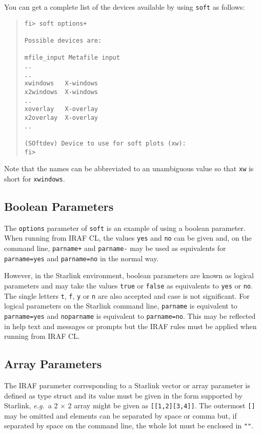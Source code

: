 \documentclass[twoside,11pt]{article}
\newcommand{\xlabel}[1]{}
\begin{document}
You can get a complete list of the devices available by using
\texttt{soft} as follows:
\begin{quote} \begin{verbatim}
fi> soft options+

Possible devices are:

mfile_input Metafile input
..
..
xwindows   X-windows
x2windows  X-windows
..
xoverlay   X-overlay
x2overlay  X-overlay
..

(SOftdev) Device to use for soft plots (xw):
fi>
\end{verbatim} \end{quote}
Note that the names can be abbreviated to an unambiguous value so that
\texttt{xw} is short for \texttt{xwindows}.

\subsection{\xlabel{boolean_parameters}Boolean Parameters}
The \texttt{options} parameter of \texttt{soft} is an example of using a
boolean parameter.
When running from IRAF CL, the values \texttt{yes} and \texttt{no} can be
given and, on the command line, \texttt{parname+} and \texttt{parname-} may be
used as equivalents for \texttt{parname=yes} and \texttt{parname=no} in the
normal way.

However, in the Starlink environment, boolean parameters are known as logical
parameters and may take the values \texttt{true} or \texttt{false} as
equivalents to \texttt{yes} or \texttt{no}.
The single letters \texttt{t}, \texttt{f}, \texttt{y} or \texttt{n} are also
accepted and case is not significant.
For logical parameters on the Starlink command line,
\texttt{parname} is equivalent to \texttt{parname=yes} and
\texttt{noparname} is equivalent to \texttt{parname=no}.
This may be reflected in help text and messages or prompts but the IRAF rules
must be applied when running from IRAF CL.

\subsection{\xlabel{array_parameters}Array Parameters}
The IRAF parameter corresponding to a Starlink vector or array parameter is
defined as type struct and its value must be given in the form supported by
Starlink, \textit{e.g.}\ a 2 $\times$ 2 array might be given as
\texttt{[[1,2][3,4]]}.
The outermost \texttt{[]} may be omitted and elements can be
separated by space or comma but, if separated by space on the command line,
the whole lot must be enclosed in \texttt{""}.
\end{document}
